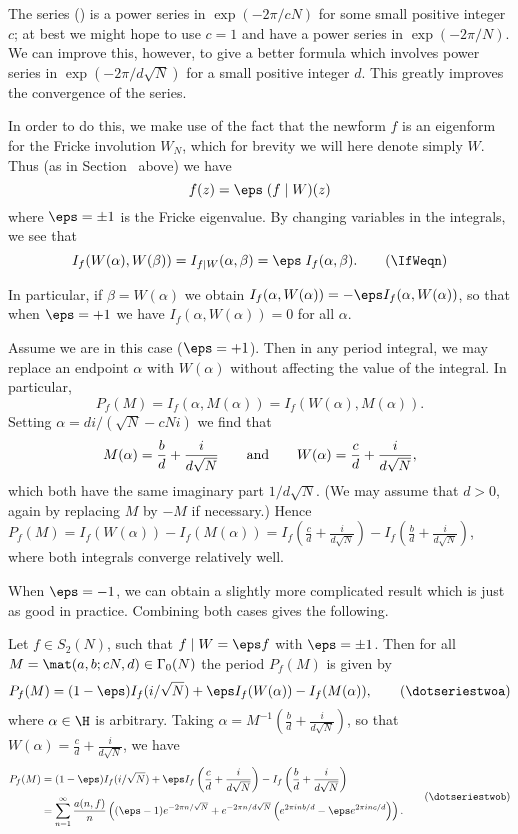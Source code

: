 The series (\dotseriesoneb) is a power series in $\exp(-2\pi/cN)$ for
some small positive integer $c$; at best we might hope to use $c=1$ and
have a power series in $\exp(-2\pi/N)$.  We can improve this, however,
to give a better formula which involves power series in
$\exp(-2\pi/d\sqrt{N})$ for a small positive integer $d$.  This
greatly improves the convergence of the series.

In order to do this, we make use of the fact that the newform $f$ is
an eigenform for the Fricke involution $W_N$, which for brevity we
will here denote simply $W$.  Thus (as in Section \Ratio\ above) we
have
$$
  f(z) = \eps\; (f\mid W)(z)
$$
where $\eps=\pm1$ is the Fricke eigenvalue.  By changing variables in
the integrals, we see that \neweq\IfWeqn
$$
   I_f(W(\alpha),W(\beta)) = I_{f\mid W}(\alpha,\beta)
                           = \eps\; I_f(\alpha,\beta).\tag\IfWeqn
$$

In particular, if $\beta=W(\alpha)$ we obtain $I_f(\alpha,W(\alpha)) =
-\eps I_f(\alpha,W(\alpha))$, so that when $\eps=+1$ we have
$I_f(\alpha,W(\alpha))=0$ for all $\alpha$.

Assume we are in this case ($\eps=+1$).  Then in any period integral,
we may replace an endpoint $\alpha$ with $W(\alpha)$ without affecting
the value of the integral.  In particular, $$ P_f(M) =
I_f(\alpha,M(\alpha)) = I_f(W(\alpha),M(\alpha)).  $$ Setting
$\alpha=di/(\sqrt{N}-cNi)$ we find that 
$$
  M(\alpha)=\frac{b}{d}+\frac{i}{d\sqrt{N}} \qquad\hbox{and}\qquad
  W(\alpha)=\frac{c}{d}+\frac{i}{d\sqrt{N}}, 
$$ 
which both have the same imaginary part $1/d\sqrt{N}$.  (We may assume
that $d>0$, again by replacing $M$ by $-M$ if necessary.)  Hence
$P_f(M)=I_f(W(\alpha))-I_f(M(\alpha)) =
I_f(\frac{c}{d}+\frac{i}{d\sqrt{N}})-I_f(\frac{b}{d}+\frac{i}{d\sqrt{N}})$,
where both integrals converge relatively well.

When $\eps=-1$, we can obtain a slightly more complicated result which
is just as good in practice.  Combining both cases gives the
following.\newprop\directperiodstwo

Let $f\in S_2(N)$, such that $f\mid W=\eps f$ with $\eps=\pm1$.  Then
for all $M=\mat(a,b;cN,d)\in\G0(N)$ the period $P_f(M)$ is given by
\neweq\dotseriestwoa
$$
  P_f(M) = (1-\eps)I_f(i/\sqrt{N}) + \eps I_f(W(\alpha)) - I_f(M(\alpha)),
\tag\dotseriestwoa
$$
where $\alpha\in\H$ is arbitrary.  Taking
$\alpha=M^{-1}(\frac{b}{d}+\frac{i}{d\sqrt{N}})$, so that
$W(\alpha)=\frac{c}{d}+\frac{i}{d\sqrt{N}}$, we have\neweq\dotseriestwob
$$\aligned
  P_f(M) &= (1-\eps)I_f(i/\sqrt{N})
 + \eps I_f\left(\frac{c}{d}+\frac{i}{d\sqrt{N}}\right) 
 -      I_f\left(\frac{b}{d}+\frac{i}{d\sqrt{N}}\right) \\ 
 &= \sum_{n=1}^{\infty}\frac{a(n,f)}{n} \left((\eps-1)e^{-2\pi
n/\sqrt{N}} + e^{-2\pi n/d\sqrt{N}} \left(e^{2\pi inb/d}-\eps e^{2\pi inc/d}
\right)\right).
\endaligned\tag\dotseriestwob
$$
\endproclaim

